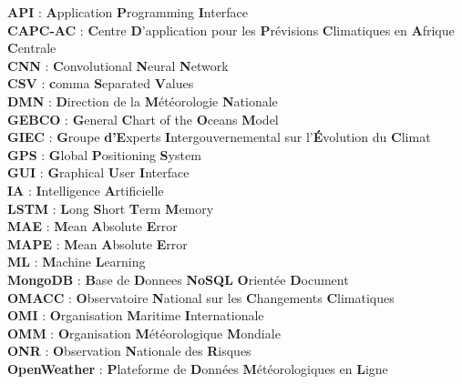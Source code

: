 \documentclass[a4paper,12pt,openany]{report}
\begin{document}
	\begin{flushleft}
	
\textbf{API} : \textbf{A}pplication \textbf{P}rogramming \textbf{I}nterface\\
\textbf{CAPC-AC} : \textbf{C}entre \textbf{D}'application pour les \textbf{P}révisions \textbf{C}limatiques en \textbf{A}frique \textbf{C}entrale\\
\textbf{CNN} : \textbf{C}onvolutional \textbf{N}eural \textbf{N}etwork\\
\textbf{CSV} : \textbf{c}omma \textbf{S}eparated \textbf{V}alues\\
\textbf{DMN} : \textbf{D}irection de la \textbf{M}étéorologie \textbf{N}ationale\\
\textbf{GEBCO} : \textbf{G}eneral \textbf{C}hart of the \textbf{O}ceans \textbf{M}odel\\
\textbf{GIEC} : \textbf{G}roupe \textbf{d'}\textbf{E}xperts \textbf{I}ntergouvernemental sur l'\textbf{É}volution du \textbf{C}limat\\
\textbf{GPS} : \textbf{G}lobal \textbf{P}ositioning \textbf{S}ystem\\
\textbf{GUI} : \textbf{G}raphical \textbf{U}ser \textbf{I}nterface\\
\textbf{IA} : \textbf{I}ntelligence \textbf{A}rtificielle\\
\textbf{LSTM} : \textbf{L}ong \textbf{S}hort \textbf{T}erm \textbf{M}emory\\
\textbf{MAE} : \textbf{M}ean \textbf{A}bsolute \textbf{E}rror\\
\textbf{MAPE} : \textbf{M}ean \textbf{A}bsolute \textbf{E}rror\\
\textbf{ML} : \textbf{M}achine \textbf{L}earning\\
\textbf{MongoDB} : \textbf{B}ase de \textbf{D}onnees \textbf{NoSQL} \textbf{O}rientée \textbf{D}ocument\\
\textbf{OMACC} : \textbf{O}bservatoire \textbf{N}ational sur les \textbf{C}hangements \textbf{C}limatiques\\
\textbf{OMI} : \textbf{O}rganisation \textbf{M}aritime \textbf{I}nternationale\\
\textbf{OMM} : \textbf{O}rganisation \textbf{M}étéorologique \textbf{M}ondiale\\
\textbf{ONR} : \textbf{O}bservation \textbf{N}ationale des \textbf{R}isques\\
\textbf{OpenWeather} : \textbf{P}lateforme de \textbf{D}onnées \textbf{M}étéorologiques en \textbf{L}igne\\

\end{flushleft}
\end{document}
